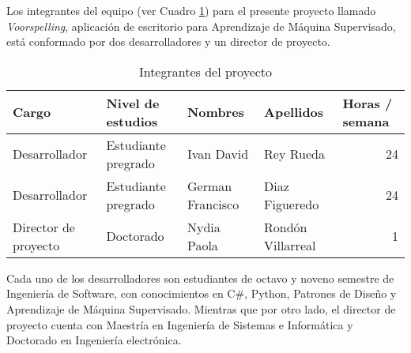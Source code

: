 Los integrantes del equipo (ver Cuadro \ref{tab:integrantes}) para el presente proyecto llamado \textit{Voorspelling}, aplicación de escritorio para Aprendizaje de Máquina Supervisado, está conformado por dos desarrolladores y un director de proyecto.

\begin{table}[H]
    \centering
    \caption{Integrantes del proyecto}
    \footnotesize
    \begin{tabular}{llllr}
        \hline
        Cargo & Nivel de estudios & Nombres & Apellidos & \multicolumn{1}{l}{Horas / semana} \bigstrut\\
        \hline
        Desarrollador & Estudiante pregrado & Ivan David & Rey Rueda & 24 \bigstrut[t]\\
        Desarrollador & Estudiante pregrado & German Francisco & Diaz Figueredo & 24 \\
        Director de proyecto & Doctorado & Nydia Paola & Rondón Villarreal & 1 \bigstrut[b]\\
        \hline
    \end{tabular}%
  \label{tab:integrantes}%
\end{table}%

Cada uno de los desarrolladores son estudiantes de octavo y noveno semestre de Ingeniería de Software, con conocimientos en C\#, Python, Patrones de Diseño y Aprendizaje de Máquina Supervisado. Mientras que por otro lado, el director de proyecto cuenta con Maestría en Ingeniería de Sistemas e Informática y Doctorado en Ingeniería electrónica.